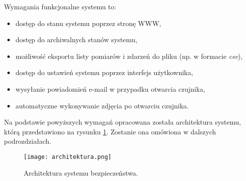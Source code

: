 \documentclass[a4paper,11pt,twoside]{article}
\begin{document}
Wymagania funkcjonalne systemu to:
\begin{itemize}
\item dostęp do stanu systemu poprzez stronę WWW,
\item dostęp do archiwalnych stanów systemu,
\item możliwość eksportu listy pomiarów i zdarzeń do pliku (np. w formacie \textit{csv}),
\item dostęp do ustawień systemu poprzez interfejs użytkownika,
\item wysyłanie powiadomień e-mail w przypadku otwarcia czujnika,
\item automatyczne wykonywanie zdjęcia po otwarciu czujnika.
\end{itemize}

Na podstawie powyższych wymagań opracowana została architektura systemu, którą przedstawiono na rysunku \ref{fig: architektura}. Zostanie ona omówiona w dalszych podrozdziałach.
\begin{figure}[h]
\begin{center}
\texttt{[image: architektura.png]}
\caption{Architektura systemu bezpieczeństwa.}
\label{fig: architektura}
\end{center}
\end{figure}
\end{document}
